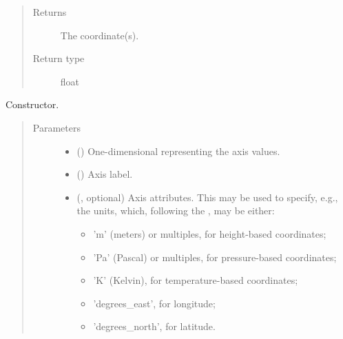\documentclass[letterpaper,10pt,english]{sphinxmanual}
\begin{document}
\begin{fulllineitems}
\begin{fulllineitems}
\begin{quote}
\begin{description}
\item[{Returns}] \leavevmode
The coordinate(s).

\item[{Return type}] \leavevmode
float

\end{description}\end{quote}

\end{fulllineitems}


\begin{fulllineitems}
\label{\detokenize{api:grids.axis.Axis.__init__}}
Constructor.
\begin{quote}\begin{description}
\item[{Parameters}] \leavevmode\begin{itemize}
\item {} 
 () \textendash{} One-dimensional  representing the axis values.

\item {} 
 () \textendash{} Axis label.

\item {} 
 (, optional) \textendash{} 
Axis attributes. This may be used to specify, e.g., the units, which, following the
, may be either:
\begin{itemize}
\item {} 
’m’ (meters) or multiples, for height-based coordinates;

\item {} 
’Pa’ (Pascal) or multiples, for pressure-based coordinates;

\item {} 
’K’ (Kelvin), for temperature-based coordinates;

\item {} 
’degrees\_east’, for longitude;

\item {} 
’degrees\_north’, for latitude.


\end{itemize}
\end{itemize}
\end{description}
\end{quote}
\end{fulllineitems}
\end{fulllineitems}
\end{document}
